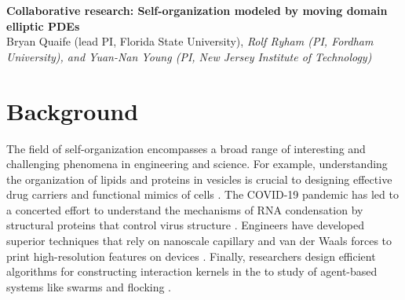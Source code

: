 \noindent
{\bf Collaborative research: Self-organization modeled by moving domain
elliptic PDEs} \\
{Bryan Quaife (lead PI, Florida State University), \em Rolf Ryham (PI,
Fordham University), and Yuan-Nan Young (PI, New Jersey Institute of
Technology)}

\section{Background}
\label{sec:background}

The field of self-organization encompasses a broad range of
interesting and challenging phenomena in engineering and science.
For example, understanding the
organization of lipids and proteins in vesicles is crucial to
designing effective drug carriers
and functional mimics of cells
\cite{Marui2022IncreasedEO,https://doi.org/10.1002/adma.202206288}.
The COVID-19 pandemic has led to a
concerted effort to understand
the mechanisms of RNA condensation by structural proteins
that control virus structure
\cite{Kim2021SelfassembledMV}.
Engineers have developed superior techniques
that rely on nanoscale  
capillary and van der Waals forces
to print high-resolution
features on devices \cite{Zeng20223DprintedMT}.
Finally, researchers design efficient algorithms for
constructing interaction kernels in the to study 
of agent-based systems like swarms and flocking
\cite{Lu2019NonparametricIO,Tadmor2021OnTM}.


